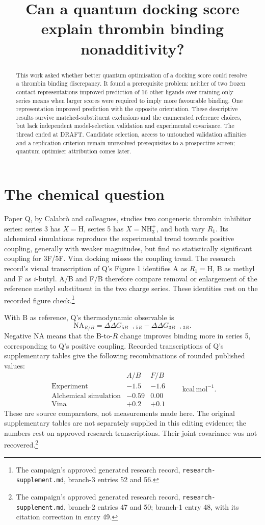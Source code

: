 \documentclass{article}
\title{Can a quantum docking score explain thrombin binding nonadditivity?}
\newcommand{\rr}[1]{\footnote{The campaign's approved generated research record, \texttt{research-supplement.md}, #1.}}
\begin{document}
\maketitle

\begin{abstract}
This work asked whether better quantum optimisation of a docking score could resolve a thrombin binding discrepancy. It found a prerequisite problem: neither of two frozen contact representations improved prediction of 16 other ligands over training-only series means when larger scores were required to imply more favourable binding. One representation improved prediction with the opposite orientation. These descriptive results survive matched-substituent exclusions and the enumerated reference choices, but lack independent model-selection validation and experimental covariance. The thread ended at DRAFT. Candidate selection, access to untouched validation affinities and a replication criterion remain unresolved prerequisites to a prospective screen; quantum optimiser attribution comes later.
\end{abstract}

\section{The chemical question}

Paper Q, by Calabr\`o and colleagues, studies two congeneric thrombin inhibitor series: series 3 has \(X=\mathrm{H}\), series 5 has \(X=\mathrm{NH}_3^+\), and both vary \(R_1\). Its alchemical simulations reproduce the experimental trend towards positive coupling, generally with weaker magnitudes, but find no statistically significant coupling for 3F/5F. Vina docking misses the coupling trend.\cite{Q} The research record's visual transcription of Q's Figure 1 identifies A as \(R_1=\mathrm{H}\), B as methyl and F as \(i\)-butyl. A/B and F/B therefore compare removal or enlargement of the reference methyl substituent in the two charge series. These identities rest on the recorded figure check.\rr{branch-3 entries 52 and 56}

With B as reference, Q's thermodynamic observable is
\[
 \mathrm{NA}_{R/B}
 =\Delta\Delta G_{5B\to5R}-\Delta\Delta G_{3B\to3R}.
\]
Negative NA means that the B-to-\(R\) change improves binding more in series 5, corresponding to Q's positive coupling.\cite{Q} Recorded transcriptions of Q's supplementary tables give the following recombinations of rounded published values:
\[
\begin{array}{c|rr}
 & A/B & F/B\\ \hline
\text{Experiment} & -1.5 & -1.6\\
\text{Alchemical simulation} & -0.59 & 0.00\\
\text{Vina} & +0.2 & +0.1
\end{array}
\qquad \mathrm{kcal\,mol^{-1}}.
\]
These are source comparators, not measurements made here. The original supplementary tables are not separately supplied in this editing evidence; the numbers rest on approved research transcriptions. Their joint covariance was not recovered.\rr{branch-2 entries 47 and 50; branch-1 entry 48, with its citation correction in entry 49}
\end{document}
